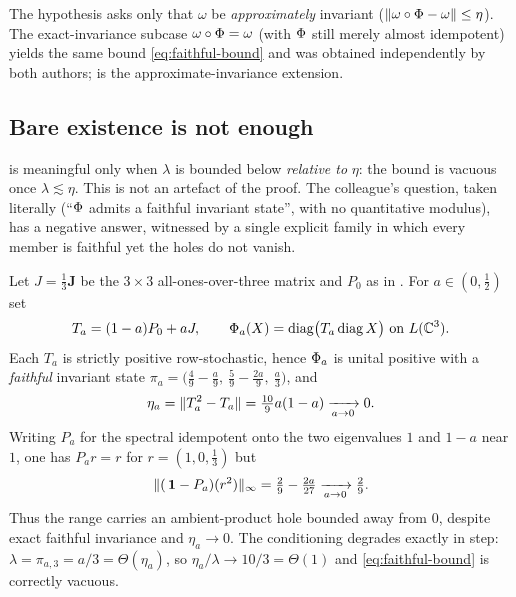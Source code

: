 \noindent
The hypothesis asks only that $\omega$ be \emph{approximately} invariant
($\lVert \omega\circ\Phi-\omega \rVert\le\eta$). The exact-invariance subcase
$\omega\circ\Phi=\omega$ (with $\Phi$ still merely almost idempotent)
yields the same bound \eqref{eq:faithful-bound} and was obtained independently by
both authors;  is the approximate-invariance extension.

\subsection*{Bare existence is not enough}

 is meaningful only when $\lambda$ is bounded below
\emph{relative to} $\eta$: the bound is vacuous once $\lambda\lesssim\eta$. This
is not an artefact of the proof. The colleague's question, taken literally
(``$\Phi$ admits a faithful invariant state'', with no quantitative modulus),
has a negative answer, witnessed by a single explicit family in which every
member is faithful yet the holes do not vanish.

\begin{proposition}
\label{prop:faithful-counterexample}
Let $J=\tfrac13\mathbf{J}$ be the $3\times3$ all-ones-over-three matrix and
$P_0$ as in . For $a\in(0,\tfrac12)$ set
\[
  T_a=(1-a)P_0+aJ,\qquad
  \Phi_a(X)=\mathrm{diag}\big(T_a\,\mathrm{diag}\,X\big)\ \text{on }L(\mathbb{C}^3).
\]
Each $T_a$ is strictly positive row-stochastic, hence $\Phi_a$ is unital
positive with a \emph{faithful} invariant state
$\pi_a=\big(\tfrac49-\tfrac a9,\ \tfrac59-\tfrac{2a}9,\ \tfrac a3\big)$, and
\[
  \eta_a=\lVert T_a^2-T_a \rVert=\tfrac{10}{9}a(1-a)\xrightarrow[a\to0]{}0 .
\]
Writing $P_a$ for the spectral idempotent onto the two eigenvalues $1$ and
$1-a$ near $1$, one has
$P_a r=r$ for $r=(1,0,\tfrac13)$ but
\[
  \lVert (\,\mathbf{1}-P_a)(r^2) \rVert_\infty=\tfrac29-\tfrac{2a}{27}\xrightarrow[a\to0]{}\tfrac29 .
\]
Thus the range carries an ambient-product hole bounded away from $0$, despite
exact faithful invariance and $\eta_a\to0$. The conditioning degrades exactly in
step: $\lambda=\pi_{a,3}=a/3=\Theta(\eta_a)$, so $\eta_a/\lambda\to10/3=\Theta(1)$
and \eqref{eq:faithful-bound} is correctly vacuous.
\end{proposition}


